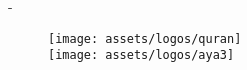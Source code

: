 \begin{titlingpage}
\begin{SingleSpace}
\begin{adjustwidth*}{\unitlength}{-\unitlength}

\end{adjustwidth*}
\end{SingleSpace}

\end{titlingpage}

\begin{figure}
\centering
\texttt{[image: assets/logos/quran]}\\
\texttt{[image: assets/logos/aya3]}
\end{figure}

\thispagestyle{empty}